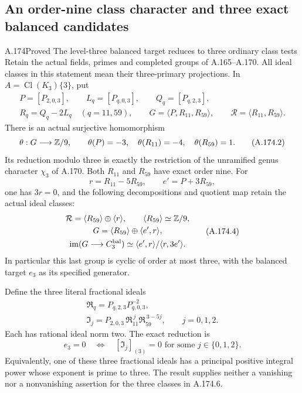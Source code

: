 \subsection{An order-nine class character and three exact balanced candidates}

\begin{statement}{A.174}{Proved}
{The level-three balanced target reduces to three ordinary class tests}
Retain the actual fields, primes and completed groups of A.165--A.170.
All ideal classes in this statement mean their three-primary projections.
In \(A=\operatorname{Cl}(K_3)\{3\}\), put
\[
 \begin{gathered}
 P=[P_{2,0,3}],\qquad L_q=[P_{q,0,3}],\qquad Q_q=[P_{q,2,3}],\\
 R_q=Q_q-2L_q\quad(q=11,59),\qquad
 G=\langle P,R_{11},R_{59}\rangle,\qquad
 \mathcal R=\langle R_{11},R_{59}\rangle .
 \end{gathered}
\tag{A.174.1}
\]
There is an actual surjective homomorphism
\[
 \theta:G\longrightarrow\mathbb Z/9,\qquad
 \theta(P)=-3,\quad\theta(R_{11})=-4,\quad\theta(R_{59})=1 .
\tag{A.174.2}
\]
Its reduction modulo three is exactly the restriction of the
unramified genus character \(\chi_3\) of A.170.
Both \(R_{11}\) and \(R_{59}\) have exact order nine.
For
\[
              r=R_{11}-5R_{59},\qquad e'=P+3R_{59},
\tag{A.174.3}
\]
one has \(3r=0\), and the following decompositions and quotient map
retain the actual ideal classes:
\[
 \begin{gathered}
 \mathcal R=\langle R_{59}\rangle\oplus\langle r\rangle,
       \qquad \langle R_{59}\rangle\simeq\mathbb Z/9,\\
 G=\langle R_{59}\rangle\oplus\langle e',r\rangle,\\
 \operatorname{im}(G\longrightarrow C_3^{\rm bal})
       \simeq \langle e',r\rangle/\langle r,3e'\rangle .
 \end{gathered}
\tag{A.174.4}
\]
In particular this last group is cyclic of order at most three,
with the balanced target \(e_3\) as its specified generator.

Define the three literal fractional ideals
\[
 \begin{gathered}
 \mathfrak R_q=P_{q,2,3}P_{q,0,3}^{-2},\\
 \mathfrak I_j
   =P_{2,0,3}\,\mathfrak R_{11}^{\,j}
                    \mathfrak R_{59}^{\,3-5j},
                  \qquad j=0,1,2 .
 \end{gathered}
\tag{A.174.5}
\]
Each has rational ideal norm two.  The exact reduction is
\[
 e_3=0
 \quad\Longleftrightarrow\quad
 [\mathfrak I_j]_{(3)}=0\text{ for some }j\in\{0,1,2\}.
\tag{A.174.6}
\]
Equivalently, one of these three fractional ideals has a principal
positive integral power whose exponent is prime to three.
The result supplies neither a vanishing nor a nonvanishing assertion
for the three classes in A.174.6.
\end{statement}

